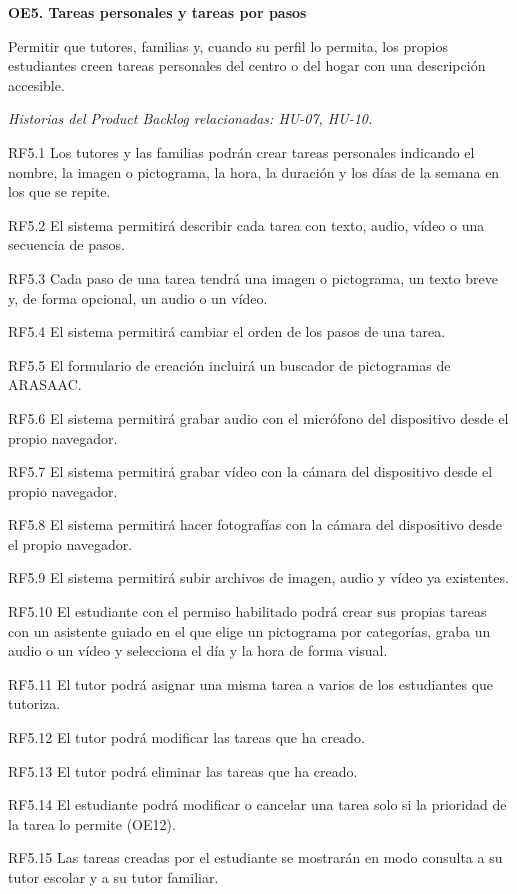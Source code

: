 \documentclass[11pt,a4paper]{article}
\newcommand{\hl}[1]{\textcolor{gblue}{\textbf{#1}}}
\newcommand{\objetivo}[4]{%
  \needspace{11\baselineskip}\par\medskip
  \noindent\colorbox{glight}{\parbox{\dimexpr\linewidth-2\fboxsep\relax}{\raggedright\hl{#1. #2}}}\par\nopagebreak
  #3\par\nopagebreak
  {\small\color{ggray}\textit{Historias del Product Backlog relacionadas: #4.}}\par\nopagebreak}
\newcommand{\grupo}[1]{\needspace{3\baselineskip}\par\smallskip\noindent{\small\bfseries\color{ggreen}#1}\par\nopagebreak}
\begin{document}
\objetivo{OE5}{Tareas personales y tareas por pasos}{Permitir que tutores, familias y, cuando su perfil lo permita, los propios estudiantes creen tareas personales del centro o del hogar con una descripción accesible.}{HU-07, HU-10}
\grupo{Requisitos funcionales (RF)}
\begin{reqs}
\item[RF5.1] Los tutores y las familias podrán crear tareas personales indicando el nombre, la imagen o pictograma, la hora, la duración y los días de la semana en los que se repite.
\item[RF5.2] El sistema permitirá describir cada tarea con texto, audio, vídeo o una secuencia de pasos.
\item[RF5.3] Cada paso de una tarea tendrá una imagen o pictograma, un texto breve y, de forma opcional, un audio o un vídeo.
\item[RF5.4] El sistema permitirá cambiar el orden de los pasos de una tarea.
\item[RF5.5] El formulario de creación incluirá un buscador de pictogramas de ARASAAC.
\item[RF5.6] El sistema permitirá grabar audio con el micrófono del dispositivo desde el propio navegador.
\item[RF5.7] El sistema permitirá grabar vídeo con la cámara del dispositivo desde el propio navegador.
\item[RF5.8] El sistema permitirá hacer fotografías con la cámara del dispositivo desde el propio navegador.
\item[RF5.9] El sistema permitirá subir archivos de imagen, audio y vídeo ya existentes.
\item[RF5.10] El estudiante con el permiso habilitado podrá crear sus propias tareas con un asistente guiado en el que elige un pictograma por categorías, graba un audio o un vídeo y selecciona el día y la hora de forma visual.
\item[RF5.11] El tutor podrá asignar una misma tarea a varios de los estudiantes que tutoriza.
\item[RF5.12] El tutor podrá modificar las tareas que ha creado.
\item[RF5.13] El tutor podrá eliminar las tareas que ha creado.
\item[RF5.14] El estudiante podrá modificar o cancelar una tarea solo si la prioridad de la tarea lo permite (OE12).
\item[RF5.15] Las tareas creadas por el estudiante se mostrarán en modo consulta a su tutor escolar y a su tutor familiar.
\end{reqs}
\end{document}
